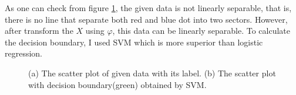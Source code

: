 \documentclass[10pt]{article}
\begin{document}
As one can check from figure \ref{fig3}, the given data is not linearly separable, that is, there is no line that separate both red and blue dot into two sectors.
However, after transform the $X$ using $\varphi$, this data can be linearly separable. To calculate the decision boundary, I used SVM which is more superior than logistic regression.

\begin{figure}[!h]
    \begin{center}
    \end{center}
    \caption{(a) The scatter plot of given data with its label. (b) The scatter plot with decision boundary(green) obtained by SVM.}
    \label{fig3}
\end{figure}
\end{document}
